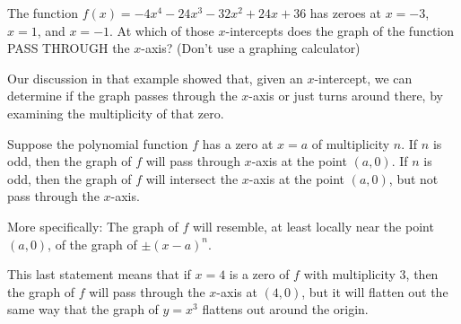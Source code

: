 \documentclass{ximera}
\begin{document}
\begin{problem}
	The function $f(x) = -4x^4 - 24x^3-32x^2+24x+36$ has zeroes at $x=-3$, $x=1$, and $x=-1$.
	At which of those $x$-intercepts does the graph of the function PASS THROUGH the $x$-axis?  (Don't use a graphing calculator)
	
	\begin{selectAll}
	\end{selectAll}
\end{problem}
Our discussion in that example showed that, given an $x$-intercept, we can determine if the graph passes through the $x$-axis or just turns around there, by
examining the multiplicity of that zero.  
\begin{theorem}
	Suppose the polynomial function $f$ has a zero at $x=a$ of multiplicity $n$.  If $n$ is odd, then the graph of $f$ will pass through $x$-axis at the point $(a,0)$.
	If $n$ is odd, then the graph of $f$ will intersect the $x$-axis at the point $(a,0)$, but not pass through the $x$-axis.
	
	More specifically: The graph of $f$ will resemble, at least locally near the point $(a,0)$, of the graph of $\pm (x-a)^n$.
\end{theorem}
This last statement means that if $x=4$ is a zero of $f$ with multiplicity $3$, then the graph of $f$ will pass through the $x$-axis at $(4,0)$, but it will flatten out the same
way that the graph of $y=x^3$ flattens out around the origin.
\end{document}
